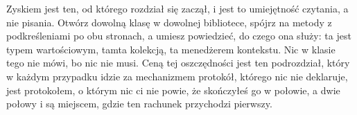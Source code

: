 \noindent
Zyskiem jest ten, od którego rozdział się zaczął, i jest to umiejętność
czytania, a nie pisania. Otwórz dowolną klasę w dowolnej bibliotece,
spójrz na metody z podkreśleniami po obu stronach, a umiesz powiedzieć, do
czego ona służy: ta jest typem wartościowym, tamta kolekcją, ta
menedżerem kontekstu. Nic w klasie tego nie mówi, bo nic nie musi. Ceną
tej oszczędności jest ten podrozdział, który w każdym przypadku idzie za
mechanizmem \dash{} protokół, którego nic nie deklaruje, jest protokołem,
o którym nic ci nie powie, że skończyłeś go w połowie, a dwie połowy
 i  są miejscem, gdzie ten rachunek
przychodzi pierwszy.

